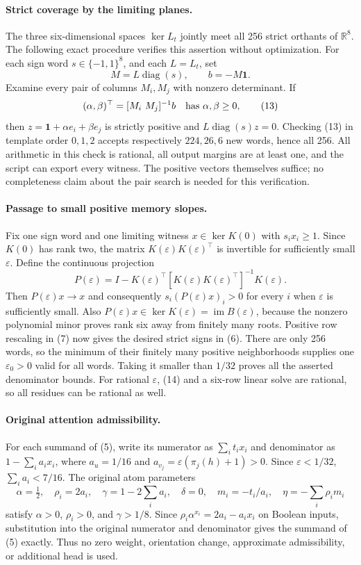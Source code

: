 \documentclass[11pt]{article}
\begin{document}
\paragraph{Strict coverage by the limiting planes.}
The three six-dimensional spaces $\ker L_t$ jointly meet all 256
strict orthants of $\mathbb R^8$. The following exact procedure
verifies this assertion without optimization. For each sign word
$s\in\{-1,1\}^8$, and each $L=L_t$, set
\[
 M=L\operatorname{diag}(s),\qquad b=-M\mathbf1.
 \tag{12}
\]
Examine every pair of columns $M_i,M_j$ with nonzero determinant.
If
\[
 (\alpha,\beta)^\top=[M_i\ M_j]^{-1}b
 \quad\hbox{has }\alpha,\beta\ge0,
 \tag{13}
\]
then $z=\mathbf1+\alpha e_i+\beta e_j$ is strictly positive and
$L\operatorname{diag}(s)z=0$. Checking (13) in template order
$0,1,2$ accepts respectively $224,26,6$ new words, hence all 256.
All arithmetic in this check is rational, all output margins are at
least one, and the script can export every witness. The positive
vectors themselves suffice; no completeness claim about the pair
search is needed for this verification.

\paragraph{Passage to small positive memory slopes.}
Fix one sign word and one limiting witness $x\in\ker K(0)$ with
$s_ix_i\ge1$. Since $K(0)$ has rank two, the matrix
$K(\varepsilon)K(\varepsilon)^\top$ is invertible for sufficiently
small $\varepsilon$. Define the continuous projection
\[
 P(\varepsilon)=I-K(\varepsilon)^\top
 [K(\varepsilon)K(\varepsilon)^\top]^{-1}K(\varepsilon).
 \tag{14}
\]
Then $P(\varepsilon)x\to x$ and consequently
$s_i(P(\varepsilon)x)_i>0$ for every $i$ when $\varepsilon$ is
sufficiently small. Also
$P(\varepsilon)x\in\ker K(\varepsilon)=\operatorname{im}B(\varepsilon)$,
because the nonzero polynomial minor proves rank six away from
finitely many roots. Positive row rescaling in (7) now gives the
desired strict signs in (6). There are only 256 words, so the
minimum of their finitely many positive neighborhoods supplies one
$\varepsilon_0>0$ valid for all words. Taking it smaller than $1/32$
proves all the asserted denominator bounds. For rational
$\varepsilon$, (14) and a six-row linear solve are rational, so
all residues can be rational as well.

\paragraph{Original attention admissibility.}
For each summand of (5), write its numerator as $\sum_i t_ix_i$
and denominator as $1-\sum_i a_ix_i$, where
$a_u=1/16$ and $a_{v_j}=\varepsilon(\pi_j(h)+1)>0$.
Since $\varepsilon<1/32$, $\sum_i a_i<7/16$. The original atom
parameters
\[
 \alpha=\tfrac12,\quad\rho_i=2a_i,\quad
 \gamma=1-2\sum_i a_i,\quad\delta=0,\quad
 m_i=-t_i/a_i,\quad\eta=-\sum_i\rho_i m_i
 \tag{15}
\]
satisfy $\alpha>0$, $\rho_i>0$, and $\gamma>1/8$.
Since $\rho_i\alpha^{x_i}=2a_i-a_ix_i$ on Boolean inputs,
substitution into the original numerator and denominator gives
the summand of (5) exactly. Thus no zero weight, orientation
change, approximate admissibility, or additional head is used.
\end{document}

